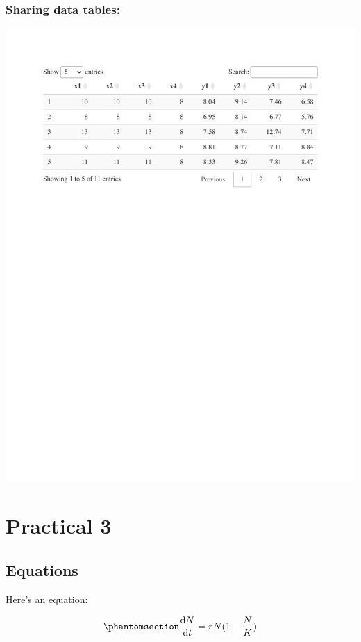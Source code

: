 \documentclass[
  letterpaper,
  DIV=11,
  numbers=noendperiod]{scrreprt}
\theoremstyle{definition}
\theoremstyle{remark}
\begin{document}
\subsection{Sharing data tables:}\label{sharing-data-tables-3}

\includegraphics{pattern_practical_2_files/figure-pdf/tab-anscombe-1.pdf}

\chapter{Practical 3}\label{practical-3}

\section{Equations}\label{equations-4}

Here's an equation:

\begin{equation}\phantomsection\label{eq-log}{ 
\frac{\mathrm{d}N}{\mathrm{d}t} = rN(1 - \frac{N}{K}) 
}\end{equation}
\end{document}

